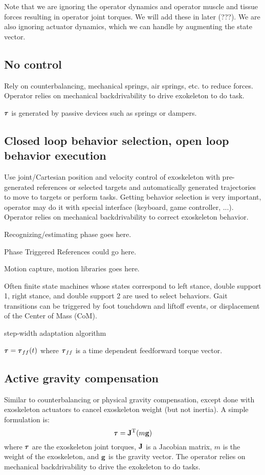 \documentclass[letterpaper,12pt,fullpage]{article}
\begin{document}
Note that we are ignoring the operator dynamics and operator muscle and tissue
forces resulting in operator joint torques. We will add these in later (???).
We are also ignoring actuator dynamics, which we can handle by augmenting 
the state vector.

\subsection{No control}

Rely on counterbalancing, mechanical springs, air springs, etc.
to reduce forces. 
Operator relies on mechanical backdrivability to drive
exokeleton to do task.

$\vtau$ is generated by passive devices such as springs or dampers.

\subsection{Closed loop behavior selection, open loop behavior
execution}

Use joint/Cartesian position and velocity control of exoskeleton 
with pre-generated references or selected targets and automatically generated trajectories to move to targets or perform tasks.
Getting behavior selection is very important, operator may do it with
special interface (keyboard, game controller, ...).
Operator relies on mechanical backdrivability to correct exoskeleton behavior.

Recognizing/estimating phase goes here.

Phase Triggered References could go here.

Motion capture, motion libraries goes here.

Often finite state machines whose states correspond to left stance, double support 1,
right stance, and double support 2 are used to select behaviors. Gait transitions
can be triggered by foot touchdown and liftoff events, or
displacement of the Center of Mass (CoM).

step-width adaptation algorithm

$\vtau = \vtau_{ff}(t)$ where $\vtau_{ff}$ is a time
dependent feedforward torque vector.

\subsection{Active gravity compensation}

Similar to counterbalancing or physical gravity compensation, except done
with exoskeleton actuators to cancel exoskeleton weight (but not inertia).
A simple formulation is:
\begin{equation}
\vtau = \mJ^{\tr} (m\vg)
\end{equation}
where $\vtau$ are the exoskeleton joint torques, 
${\bf J}$ is a Jacobian matrix, $m$ is the weight of the exoskeleton,
and ${\bf g}$ is the gravity vector. 
The operator relies on mechanical backdrivability to drive
the exokeleton to do tasks.
\end{document}
